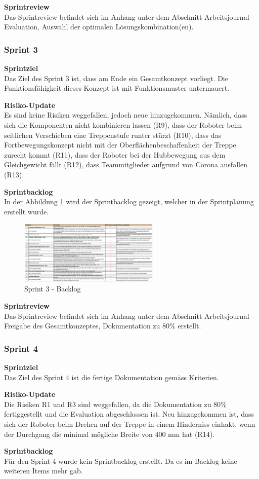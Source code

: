 \textbf{Sprintreview}\\
Das Sprintreview befindet sich im Anhang unter dem Abschnitt Arbeitsjournal - Evaluation, Auswahl der optimalen Lösungskombination(en).

\subsubsection{Sprint 3}
\textbf{Sprintziel}\\
Das Ziel des Sprint 3 ist, dass am Ende ein Gesamtkonzept vorliegt. Die Funktionsfähigkeit dieses Konzept ist mit Funktionsmuster untermauert.

\textbf{Risiko-Update}\\
Es sind keine Risiken weggefallen, jedoch neue hinzugekommen. Nämlich, dass sich die Komponenten nicht kombinieren lassen (R9), dass der Roboter beim seitlichen Verschieben eine Treppenstufe runter stürzt (R10), dass das Fortbewegungskonzept nicht mit der Oberflächenbeschaffenheit der Treppe zurecht kommt (R11), dass der Roboter bei der Hubbewegung aus dem Gleichgewicht fällt (R12), dass Teammitglieder aufgrund von Corona ausfallen (R13).

\textbf{Sprintbacklog}\\
In der Abbildung \ref{fig:sprint-backlog-3} wird der Sprintbacklog gezeigt, welcher in der Sprintplanung erstellt wurde.
\begin{figure}[H]
  \includegraphics[angle=270,width=0.6\textwidth]{img/projektmanagement/sprint3-backlog2.png}
  \centering
  \caption{Sprint 3 - Backlog}
  \label{fig:sprint-backlog-3}
\end{figure}

\textbf{Sprintreview}\\
Das Sprintreview befindet sich im Anhang unter dem Abschnitt Arbeitsjournal - Freigabe des Gesamtkonzeptes, Dokumentation zu 80\% erstellt.

\subsubsection{Sprint 4}
\textbf{Sprintziel}\\
Das Ziel des Sprint 4 ist die fertige Dokumentation gemäss Kriterien.

\textbf{Risiko-Update}\\
Die Risiken R1 und R3 sind weggefallen, da die Dokumentation zu 80\% fertiggestellt und die Evaluation abgeschlossen ist. Neu hinzugekommen ist, dass sich der Roboter beim Drehen auf der Treppe in einem Hinderniss einhakt, wenn der Durchgang die minimal mögliche Breite von 400 mm hat (R14).

\textbf{Sprintbacklog}\\
Für den Sprint 4 wurde kein Sprintbacklog erstellt. Da es im Backlog keine weiteren Items mehr gab.

